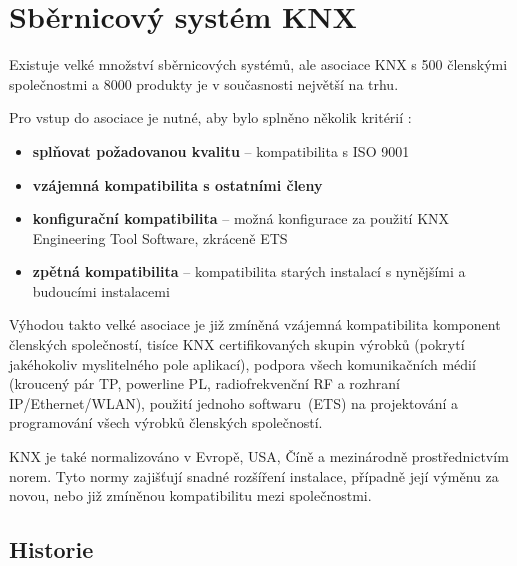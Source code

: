 \chapter{Sběrnicový systém KNX}
Existuje velké množství sběrnicových systémů, ale asociace KNX s 500 členskými společnostmi a 8000 produkty je v současnosti největší na trhu. \cite{Asociace KNX}

\noindent Pro vstup do asociace je nutné, aby bylo splněno několik kritérií \cite{KNX principles}:
\begin{itemize}
  \item \textbf{splňovat požadovanou kvalitu} -- kompatibilita s ISO 9001
  \item \textbf{vzájemná kompatibilita s ostatními členy}
  \item \textbf{konfigurační kompatibilita} -- možná konfigurace za použití KNX Engineering Tool Software, zkráceně ETS
  \item \textbf{zpětná kompatibilita} -- kompatibilita starých instalací s nynějšími a budoucími instalacemi \newline
\end{itemize}

\noindent Výhodou takto velké asociace je již zmíněná vzájemná kompatibilita komponent členských společností, tisíce KNX certifikovaných skupin výrobků (pokrytí jakéhokoliv myslitelného pole aplikací), podpora všech komunikačních médií (kroucený pár TP, powerline PL, radiofrekvenční RF a rozhraní IP/Ethernet/WLAN), použití jednoho softwaru~(ETS) na projektování a programování všech výrobků členských společností. \cite{KNX principles}

KNX je také normalizováno v Evropě, USA, Číně a mezinárodně prostřednictvím norem. Tyto normy zajišťují snadné rozšíření instalace, případně její výměnu za novou, nebo již zmíněnou kompatibilitu mezi společnostmi. \cite{KNX basics}

\section{Historie}
